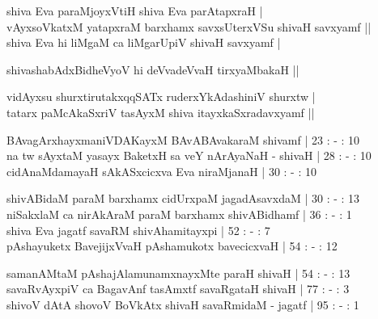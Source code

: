 \begin{entry}
\begin{shl}
shiva Eva paraMjoyxVtiH shiva Eva parAtapxraH |\\
vAyxsoVkatxM yatapxraM barxhamx savxsUterxVSu shivaH savxyamf ||\\
shiva Eva hi liMgaM ca liMgarUpiV shivaH savxyamf |
\end{shl}
\begin{shl}
shivashabAdxBidheVyoV hi deVvadeVvaH tirxyaMbakaH ||
\end{shl}
\begin{shl}
vidAyxsu shurxtirutakxqqSATx ruderxYkAdashiniV shurxtw |\\
tatarx paMcAkaSxriV tasAyxM shiva itayxkaSxradavxyamf ||
\end{shl}
\gl{}
\begin{shl}
BAvagArxhayxmaniVDAKayxM BAvABAvakaraM shivamf | 23 : - : 10\\
na tw sAyxtaM yasayx BaketxH sa veY nArAyaNaH -  shivaH | 28 : - : 10
cidAnaMdamayaH sAkASxcicxva Eva niraMjanaH | 30 : - : 10
\end{shl}
\gl{}
\begin{shl}
shivABidaM paraM barxhamx cidUrxpaM jagadAsavxdaM | 30 : - : 13\\
niSakxlaM ca nirAkAraM paraM barxhamx shivABidhamf | 36 : - : 1\\
shiva Eva jagatf savaRM shivAhamitayxpi | 52 : - : 7\\
pAshayuketx BavejijxVvaH pAshamukotx bavecicxvaH | 54 : - : 12
\end{shl}
\gl{}
\begin{shl}
samanAMtaM pAshajAlamunamxnayxMte paraH shivaH | 54 : - : 13\\
savaRvAyxpiV ca BagavAnf tasAmxtf savaRgataH shivaH | 77 : - : 3\\
shivoV dAtA shovoV BoVkAtx shivaH savaRmidaM - jagatf | 95 : - : 1\\

\end{shl}
\end{entry}
